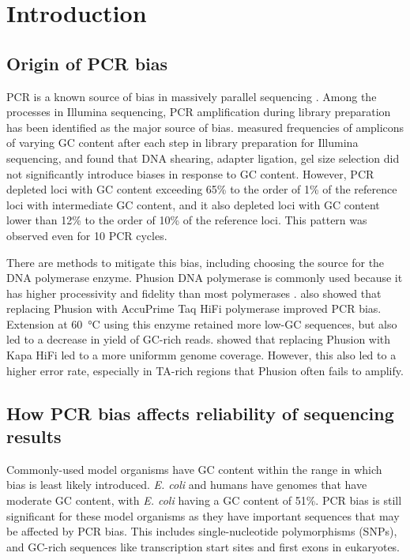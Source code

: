 \documentclass[parskip=full, numbers=noenddot]{scrreprt}
\begin{document}
\section{Introduction}
\label{sec:pcrbias_intro}

\subsection{Origin of PCR bias}
\label{ssec:pcrbias_intro_origin}

PCR is a known source of bias in massively parallel sequencing \citep{olova_comparison_2018}.  Among the processes in Illumina sequencing, PCR amplification during library preparation has been identified as the major source of bias.  \citet{aird_analyzing_2011} measured frequencies of amplicons of varying GC content after each step in library preparation for Illumina sequencing, and found that DNA shearing, adapter ligation, gel size selection did not significantly introduce biases in response to GC content.  However, PCR depleted loci with GC content exceeding 65\% to the order of 1\% of the reference loci with intermediate GC content, and it also depleted loci with GC content lower than 12\% to the order of 10\% of the reference loci.  This pattern was observed even for 10 PCR cycles.

There are methods to mitigate this bias, including choosing the source for the DNA polymerase enzyme.  Phusion DNA polymerase is commonly used because it has higher processivity and fidelity than most polymerases \citep{quail_optimal_2012}.  \citet{aird_analyzing_2011} also showed that replacing Phusion with AccuPrime Taq HiFi polymerase improved PCR bias.  Extension at \SI{60}{\celsius} using this enzyme retained more low-GC sequences, but also led to a decrease in yield of GC-rich reads.  \citet{quail_optimal_2012} showed that replacing Phusion with Kapa HiFi led to a more uniformm genome coverage.  However, this also led to a higher error rate, especially in TA-rich regions that Phusion often fails to amplify.

\subsection{How PCR bias affects reliability of sequencing results}
\label{ssec:pcrbias_intro_effects}

Commonly-used model organisms have GC content within the range in which bias is least likely introduced.  \emph{E. coli} and humans have genomes that have moderate GC content, with \emph{E. coli} having a GC content of 51\%.  PCR bias is still significant for these model organisms as they have important sequences that may be affected by PCR bias.  This includes single-nucleotide polymorphisms (SNPs), and GC-rich sequences like transcription start sites and first exons in eukaryotes.  %
\end{document}
